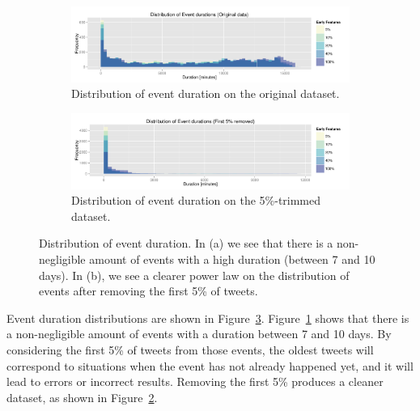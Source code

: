 \begin{figure}[t]
  \centering
  \begin{subfigure}{\textwidth}
    \includegraphics[width=\textwidth]{figures/data/dist-events-durations-o.pdf}
    \caption[Distribution of event duration on the original
      dataset.]{Distribution of event duration on the original dataset.} 
    \label{sfig:dist-events-durations-o}
  \end{subfigure}

  \begin{subfigure}{\textwidth}
    \centering
    \includegraphics[width=\textwidth]{figures/data/dist-events-durations-5.pdf}
    \caption[Distribution of event duration on the 5\%-trimmed
      dataset.]{Distribution of event duration on the 5\%-trimmed dataset.} 
    \label{sfig:dist-events-durations-5}
  \end{subfigure}

  \caption[Distribution of event duration]{Distribution of event duration. In
    (a) we see that there is a non-negligible amount of events with a
    high duration (between 7 and 10 days). In (b), we see a clearer power law on
    the distribution of events after removing the first 5\% of tweets.}
  \label{fig:dist-events-durations}
\end{figure}

Event duration distributions are shown in
Figure~\ref{fig:dist-events-durations}. 
%
Figure~\ref{sfig:dist-events-durations-o} shows that there is a non-negligible
amount of events with a duration between 7 and 10 days. 
%
By considering the first 5\% of tweets from those events, the oldest tweets will
correspond to situations when the event has not already happened yet, and it
will lead to errors or incorrect results. 
%
Removing the first 5\% produces a cleaner dataset, as shown in
Figure~\ref{sfig:dist-events-durations-5}.


